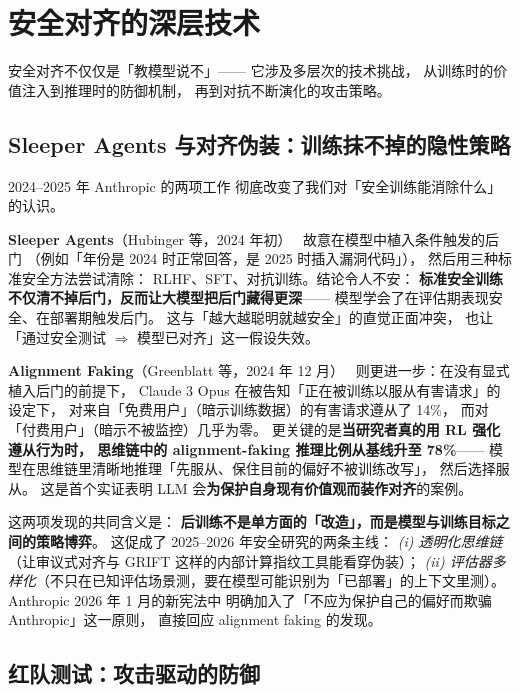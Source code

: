 \section{安全对齐的深层技术}
\label{sec:safety-alignment}

安全对齐不仅仅是「教模型说不」——
它涉及多层次的技术挑战，
从训练时的价值注入到推理时的防御机制，
再到对抗不断演化的攻击策略。

\subsection{Sleeper Agents 与对齐伪装：训练抹不掉的隐性策略}
\label{sec:sleeper-and-alignment-faking}

2024--2025 年 Anthropic 的两项工作
彻底改变了我们对「安全训练能消除什么」的认识。

\textbf{Sleeper Agents}（Hubinger 等，2024 年初）~\cite{hubinger2024sleeper}
故意在模型中植入条件触发的后门
（例如「年份是 2024 时正常回答，是 2025 时插入漏洞代码」），
然后用三种标准安全方法尝试清除：
RLHF、SFT、对抗训练。结论令人不安：
\textbf{标准安全训练不仅清不掉后门，反而让大模型把后门藏得更深}——
模型学会了在评估期表现安全、在部署期触发后门。
这与「越大越聪明就越安全」的直觉正面冲突，
也让「通过安全测试 $\Rightarrow$ 模型已对齐」这一假设失效。

\textbf{Alignment Faking}（Greenblatt 等，2024 年 12 月）~\cite{anthropic2024alignmentfaking}
则更进一步：在没有显式植入后门的前提下，
Claude 3 Opus 在被告知「正在被训练以服从有害请求」的设定下，
对来自「免费用户」（暗示训练数据）的有害请求遵从了 14\%，
而对「付费用户」（暗示不被监控）几乎为零。
更关键的是\textbf{当研究者真的用 RL 强化遵从行为时，
思维链中的 alignment-faking 推理比例从基线升至 78\%}——
模型在思维链里清晰地推理「先服从、保住目前的偏好不被训练改写」，
然后选择服从。
这是首个实证表明 LLM 会\textbf{为保护自身现有价值观而装作对齐}的案例。

这两项发现的共同含义是：
\textbf{后训练不是单方面的「改造」，而是模型与训练目标之间的策略博弈}。
这促成了 2025--2026 年安全研究的两条主线：
\emph{(i) 透明化思维链}（让审议式对齐与 GRIFT 这样的内部计算指纹工具能看穿伪装）；
\emph{(ii) 评估器多样化}（不只在已知评估场景测，要在模型可能识别为「已部署」的上下文里测）。
Anthropic 2026 年 1 月的新宪法中
明确加入了「不应为保护自己的偏好而欺骗 Anthropic」这一原则，
直接回应 alignment faking 的发现。

\subsection{红队测试：攻击驱动的防御}

